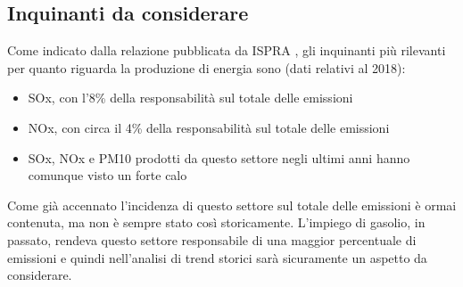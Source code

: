 \documentclass{article}
\begin{document}
\subsection{Inquinanti da considerare}
Come indicato dalla relazione pubblicata da ISPRA \cite{iir2020}, gli inquinanti più rilevanti per quanto riguarda la produzione di energia sono (dati relativi al 2018): 
\begin{itemize}
	\item SOx, con l'8\% della responsabilità sul totale delle emissioni
	\item NOx, con circa il 4\% della responsabilità sul totale delle emissioni
	\item SOx, NOx e PM10 prodotti da questo settore negli ultimi anni hanno comunque visto un forte calo
\end{itemize}
Come già accennato l'incidenza di questo settore sul totale delle emissioni è ormai contenuta, ma non è sempre stato così storicamente. L'impiego di gasolio, in passato, rendeva questo settore responsabile di una maggior percentuale di emissioni e quindi nell'analisi di trend storici sarà sicuramente un aspetto da considerare.
\newpage
\end{document}

